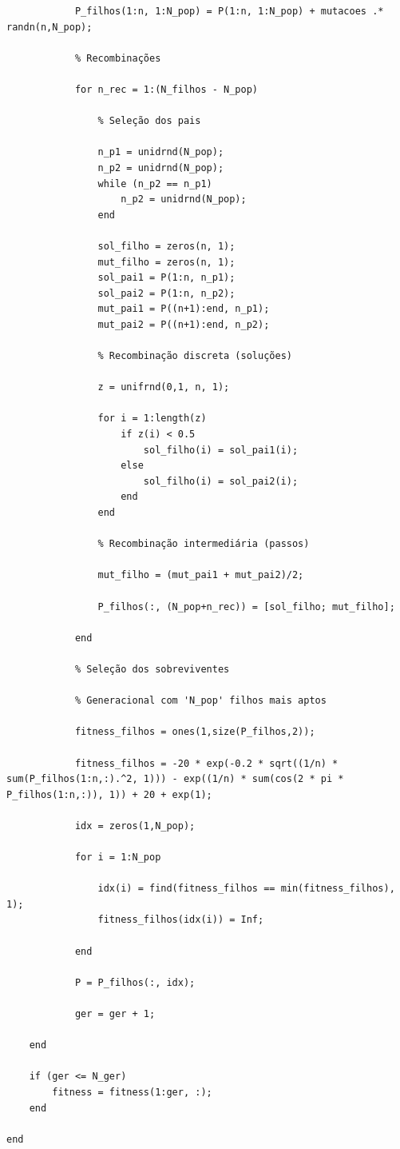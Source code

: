 \documentclass{report}
\begin{document}
\begin{lstlisting}
            P_filhos(1:n, 1:N_pop) = P(1:n, 1:N_pop) + mutacoes .* randn(n,N_pop);

            % Recombinações

            for n_rec = 1:(N_filhos - N_pop)
                
                % Seleção dos pais                

                n_p1 = unidrnd(N_pop);
                n_p2 = unidrnd(N_pop);
                while (n_p2 == n_p1)
                    n_p2 = unidrnd(N_pop);
                end
                        
                sol_filho = zeros(n, 1);
                mut_filho = zeros(n, 1);
                sol_pai1 = P(1:n, n_p1);
                sol_pai2 = P(1:n, n_p2);
                mut_pai1 = P((n+1):end, n_p1);
                mut_pai2 = P((n+1):end, n_p2);

                % Recombinação discreta (soluções)
                
                z = unifrnd(0,1, n, 1);

                for i = 1:length(z)
                    if z(i) < 0.5
                        sol_filho(i) = sol_pai1(i);
                    else
                        sol_filho(i) = sol_pai2(i);
                    end
                end

                % Recombinação intermediária (passos)

                mut_filho = (mut_pai1 + mut_pai2)/2;

                P_filhos(:, (N_pop+n_rec)) = [sol_filho; mut_filho];
                    
            end

            % Seleção dos sobreviventes

            % Generacional com 'N_pop' filhos mais aptos

            fitness_filhos = ones(1,size(P_filhos,2));
            
            fitness_filhos = -20 * exp(-0.2 * sqrt((1/n) * sum(P_filhos(1:n,:).^2, 1))) - exp((1/n) * sum(cos(2 * pi * P_filhos(1:n,:)), 1)) + 20 + exp(1);

            idx = zeros(1,N_pop);

            for i = 1:N_pop

                idx(i) = find(fitness_filhos == min(fitness_filhos), 1);
                fitness_filhos(idx(i)) = Inf;

            end

            P = P_filhos(:, idx);

            ger = ger + 1;

    end

    if (ger <= N_ger)
        fitness = fitness(1:ger, :);
    end

end


	\end{lstlisting}
	
\end{document}
